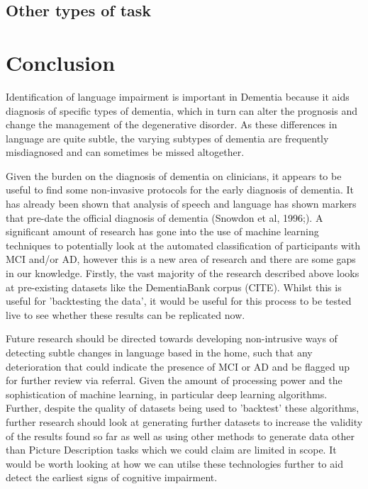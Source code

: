 \documentclass[a4paper]{article}
\begin{document}
\subsection{Other types of task}

\section{Conclusion}
\par
Identification of language impairment is important in Dementia because it aids diagnosis of specific types of dementia, which in turn can alter the prognosis and change the management of the degenerative disorder. As these differences in language are quite subtle, the varying subtypes of dementia are frequently misdiagnosed and can sometimes be missed altogether. 
\newline
\par 
Given the burden on the diagnosis of dementia on clinicians, it appears to be useful to find some non-invasive protocols for the early diagnosis of dementia. It has already been shown that analysis of speech and language has shown markers that pre-date the official diagnosis of dementia (Snowdon et al, 1996;)\cite{Berisha2015}. A significant amount of research has gone into the use of machine learning techniques to potentially look at the automated classification of participants with MCI and/or AD, however this is a new area of research and there are some gaps in our knowledge. Firstly, the vast majority of the research described above looks at pre-existing datasets like the DementiaBank corpus (CITE). Whilst this is useful for 'backtesting the data', it would be useful for this process to be tested live to see whether these results can be replicated now. \newline 
\par
Future research should be directed towards developing non-intrusive ways of detecting subtle changes in language based in the home, such that any deterioration that could indicate the presence of MCI or AD and be flagged up for further review via referral. Given the amount of processing power and the sophistication of machine learning, in particular deep learning algorithms. Further, despite the quality of datasets being used to 'backtest' these algorithms, further research should look at generating further datasets to increase the validity of the results found so far as well as using other methods to generate data other than Picture Description tasks which we could claim are limited in scope. It would be worth looking at how we can utilse these technologies further to aid detect the earliest signs of cognitive impairment.  



\end{document}

